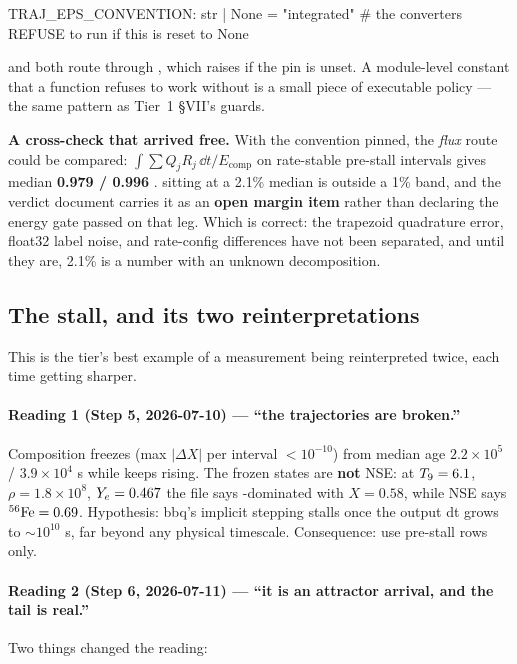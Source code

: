 \begin{srclisting}
TRAJ_EPS_CONVENTION: str | None = "integrated"
# the converters REFUSE to run if this is reset to None
\end{srclisting}

 and  both route through
, which raises if the pin is unset. A module-level
constant that a function refuses to work without is a small piece of executable
policy --- the same pattern as Tier~1 \S VII's guards.

\textbf{A cross-check that arrived free.} With the convention pinned, the
\emph{flux} route could be compared: $\int \sum Q_j R_j\,\dd t / E_{\mathrm{comp}}$
on rate-stable pre-stall intervals gives median \textbf{0.979 / 0.996}
.  sitting at a 2.1\% median is outside a 1\%
band, and the verdict document carries it as an \textbf{open margin item}
rather than declaring the energy gate passed on that leg. Which is correct: the
trapezoid quadrature error, float32 label noise, and rate-config differences
have not been separated, and until they are, 2.1\% is a number with an unknown
decomposition.

\subsection{The stall, and its two reinterpretations}
\label{sec:stall}

This is the tier's best example of a measurement being reinterpreted twice,
each time getting sharper.

\paragraph{Reading 1 (Step 5, 2026-07-10) --- ``the trajectories are
broken.''} Composition freezes (max $|\Delta X|$ per interval $< 10^{-10}$)
from median age $2.2 \times 10^{5}$ / $3.9 \times 10^{4}$ s while
 keeps rising. The frozen states are \textbf{not} NSE: at
$\Tn = 6.1$, $\rho = 1.8 \times 10^{8}$, $\Ye = 0.467$ the file says
-dominated with $X = 0.58$, while NSE says $\nuc{Fe}{56} = 0.69$.
Hypothesis: bbq's implicit stepping stalls once the output dt grows to
${\sim}10^{10}$ s, far beyond any physical timescale. Consequence: use
pre-stall rows only. 

\paragraph{Reading 2 (Step 6, 2026-07-11) --- ``it is an attractor arrival,
and the tail is real.''} Two things changed the reading:


